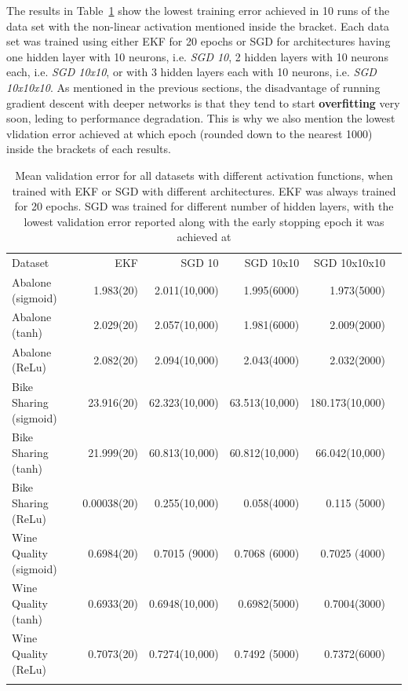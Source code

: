 \documentclass{article}
\begin{document}
The results in Table~\ref{tab:results} show the lowest training error achieved in 10 runs of the data set with the non-linear activation mentioned inside the bracket. Each data set was trained using either EKF for 20 epochs or SGD for architectures having one hidden layer with 10 neurons, i.e. \textit{SGD 10}, 2 hidden layers with 10 neurons each, i.e. \textit{SGD 10x10}, or  with 3 hidden layers each with 10 neurons, i.e. \textit{SGD 10x10x10}. As mentioned in the previous sections, the disadvantage of running gradient descent with deeper networks is that they tend to start \textbf{overfitting} very soon, leding to performance degradation. This is why we also mention the lowest vlidation error achieved at which epoch (rounded down to the nearest 1000) inside the brackets of each results. 
\begin{table}[ht]
    \centering
    \begin{tabular}{lrrrrr}
        \hline
         Dataset & EKF  & SGD 10 & SGD 10x10 & SGD 10x10x10 \\
         \hhline{======}
         Abalone (sigmoid)& 1.983(20) & 2.011(10,000)& 1.995(6000) &1.973(5000) \\
         Abalone (tanh)& 2.029(20) & 2.057(10,000) & 1.981(6000) & 2.009(2000) \\
         Abalone (ReLu)& 2.082(20) & 2.094(10,000)& 2.043(4000) &2.032(2000)  \\
         \hline
         Bike Sharing (sigmoid)& 23.916(20) &62.323(10,000)&63.513(10,000) & 180.173(10,000) \\
         Bike Sharing (tanh)&21.999(20) &60.813(10,000) & 60.812(10,000) & 66.042(10,000) \\
         Bike Sharing (ReLu)&  0.00038(20) & 0.255(10,000) & 0.058(4000) &0.115 (5000)\\
         \hline
         Wine Quality (sigmoid)& 0.6984(20) &0.7015 (9000) & 0.7068 (6000) & 0.7025 (4000)\\
         Wine Quality (tanh)& 0.6933(20) &  0.6948(10,000) & 0.6982(5000) & 0.7004(3000)\\
         Wine Quality (ReLu)& 0.7073(20)& 0.7274(10,000) & 0.7492 (5000) & 0.7372(6000)\\
         \hline
\\
    \end{tabular}
    \caption{Mean validation error for all datasets with different activation functions, when trained with EKF or SGD with different architectures. EKF was always trained for 20 epochs. SGD was trained for different number of hidden layers, with the lowest validation error reported along with the early stopping epoch it was achieved at }
    \label{tab:results}
\end{table}
\end{document}
